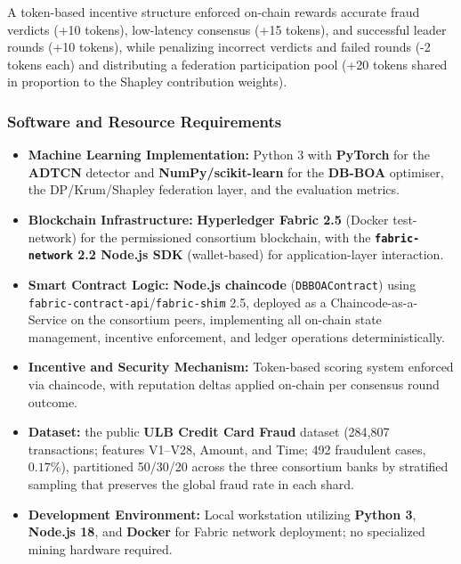 A token-based incentive structure enforced on-chain rewards accurate fraud verdicts (+10 tokens), low-latency consensus (+15 tokens), and successful leader rounds (+10 tokens), while penalizing incorrect verdicts and failed rounds (-2 tokens each) and distributing a federation participation pool (+20 tokens shared in proportion to the Shapley contribution weights).

\subsubsection*{Software and Resource Requirements}

\begin{itemize}
\item \textbf{Machine Learning Implementation:} Python 3 with \textbf{PyTorch} for the \textbf{ADTCN} detector and \textbf{NumPy/scikit-learn} for the \textbf{DB-BOA} optimiser, the DP/Krum/Shapley federation layer, and the evaluation metrics.
\item \textbf{Blockchain Infrastructure:} \textbf{Hyperledger Fabric 2.5} (Docker test-network) for the permissioned consortium blockchain, with the \textbf{\texttt{fabric-network} 2.2 Node.js SDK} (wallet-based) for application-layer interaction.
\item \textbf{Smart Contract Logic:} \textbf{Node.js chaincode} (\texttt{DBBOAContract}) using \texttt{fabric-contract-api}/\allowbreak\texttt{fabric-shim} 2.5, deployed as a Chaincode-as-a-Service on the consortium peers, implementing all on-chain state management, incentive enforcement, and ledger operations deterministically.
\item \textbf{Incentive and Security Mechanism:} Token-based scoring system enforced via chaincode, with reputation deltas applied on-chain per consensus round outcome.
\item \textbf{Dataset:} the public \textbf{ULB Credit Card Fraud} dataset (284{,}807 transactions; features V1--V28, Amount, and Time; 492 fraudulent cases, $0.17\%$), partitioned 50/30/20 across the three consortium banks by stratified sampling that preserves the global fraud rate in each shard.
\item \textbf{Development Environment:} Local workstation utilizing \textbf{Python 3}, \textbf{Node.js 18}, and \textbf{Docker} for Fabric network deployment; no specialized mining hardware required.
\end{itemize}

